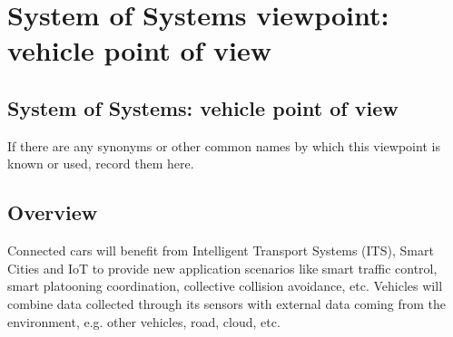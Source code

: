 \section{System of Systems viewpoint: vehicle point of view}
\renewcommand{\Fillin}[1]{{System of Systems: vehicle point of view}}
\subsection{\Fillin{Viewpoint Name}}\label{vp:template}


If there are any synonyms or other common names by which this viewpoint is
known or used, record them here.


\subsection{Overview} 
Connected cars will benefit from Intelligent Transport Systems (ITS), Smart Cities and IoT to provide new application scenarios like smart traffic control,  smart platooning coordination, collective collision avoidance, etc. 
Vehicles will combine data collected through its sensors %
with external data coming from the environment, e.g. other vehicles, road, cloud, etc. %

